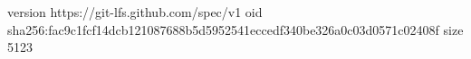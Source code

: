version https://git-lfs.github.com/spec/v1
oid sha256:fac9c1fcf14dcb121087688b5d5952541eccedf340be326a0c03d0571c02408f
size 5123
